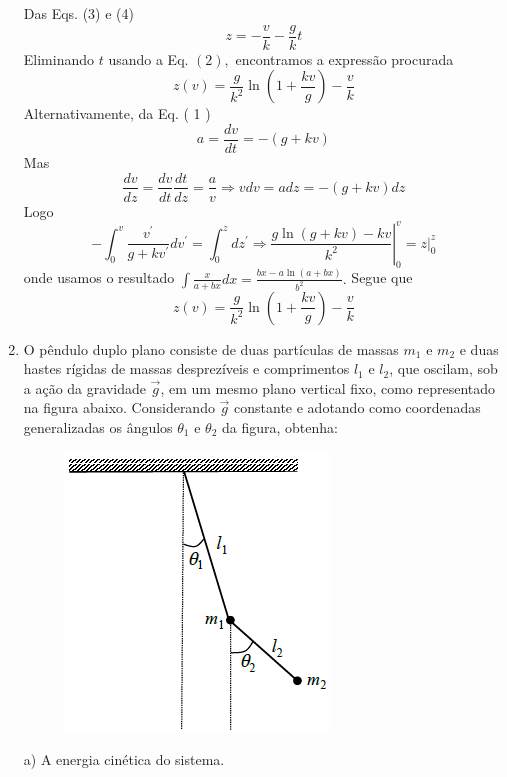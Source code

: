 \begin{enumerate}[start=1,label={\bfseries Q\arabic*.}]
\resposta Das Eqs. (3) e (4)
$$
z=-\frac{v}{k}-\frac{g}{k} t
$$
Eliminando $t$ usando a Eq. $(2),$ encontramos a expressão procurada
$$
z(v)=\frac{g}{k^{2}} \ln \left(1+\frac{k v}{g}\right)-\frac{v}{k}
$$
Alternativamente, da Eq. ( 1 )
$$
a=\frac{d v}{d t}=-(g+k v)
$$
Mas
$$
\frac{d v}{d z}=\frac{d v}{d t} \frac{d t}{d z}=\frac{a}{v} \Rightarrow v d v=a d z=-(g+k v) d z
$$
Logo
$$
-\int_{0}^{v} \frac{v^{\prime}}{g+k v^{\prime}} d v^{\prime}=\left.\int_{0}^{z} d z^{\prime} \Rightarrow \frac{g \ln (g+k v)-k v}{k^{2}}\right|_{0} ^{v}=\left.z\right|_{0} ^{z}
$$
onde usamos o resultado $\int \frac{x}{a+b x} d x=\frac{b x-a \ln (a+b x)}{b^{2}} .$ Segue que
$$
z(v)=\frac{g}{k^{2}} \ln \left(1+\frac{k v}{g}\right)-\frac{v}{k}
$$




\item O pêndulo duplo plano consiste de duas partículas de massas $m_{1}$ e $m_{2}$ e duas hastes rígidas de massas desprezíveis e comprimentos $l_{1}$ e $l_{2}$, que oscilam, sob a ação da gravidade $\vec{g}$, em um mesmo plano vertical fixo, como representado na figura abaixo. Considerando $\vec{g}$ constante e adotando como coordenadas generalizadas os ângulos $\theta_{1}$ e $\theta_{2}$ da figura, obtenha:

\begin{figure}[H]
\centering
\includegraphics[scale=1]{classica-img/pendulo2.png}
\end{figure}


a) A energia cinética do sistema.


\end{enumerate}
